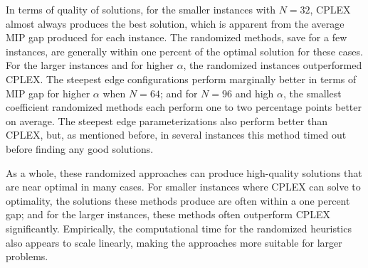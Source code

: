 \documentclass[pdflatex,sn-mathphys-num]{sn-jnl}%
\begin{document}
In terms of quality of solutions, for the smaller instances with $N=32$, CPLEX almost always produces the best solution, which is apparent from the average MIP gap produced for each instance. The randomized methods, save for a few instances, are generally within one percent of the optimal solution for these cases. For the larger instances and for higher $\alpha$, the randomized instances outperformed CPLEX. The steepest edge configurations perform marginally better in terms of MIP gap for higher $\alpha$ when $N=64$; and for $N=96$ and high $\alpha$, the smallest coefficient randomized methods each perform one to two percentage points better on average. The steepest edge parameterizations also perform better than CPLEX, but, as mentioned before, in several instances  this method timed out before finding any good solutions.

As a whole, these randomized approaches can produce high-quality solutions that are near optimal in many cases. For smaller instances where CPLEX can solve to optimality, the solutions these methods produce are often within a one percent gap; and for the larger instances, these methods often outperform CPLEX significantly.
Empirically, the computational time for the randomized heuristics also appears to scale linearly, making the approaches more suitable for larger problems.

      
\end{document}
